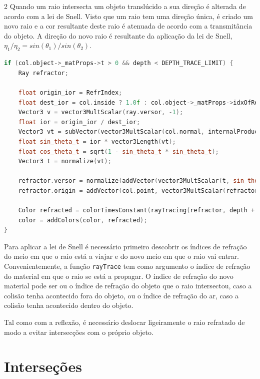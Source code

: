 \documentclass{article}
\begin{document}
\begin{multicols}{2}
    Quando um raio intersecta um objeto translúcido a sua direção é alterada
    de acordo com a lei de Snell. Visto que um raio tem uma direção única, é criado
    um novo raio e a cor resultante deste raio é atenuada de acordo com
    a transmitância do objeto. A direção do novo raio é resultante da aplicação
    da lei de Snell, $\eta_1/\eta_2 = sin(\theta_1)/sin(\theta_2)$.

\begin{lstlisting}[language=C++]
if (col.object->_matProps->t > 0 && depth < DEPTH_TRACE_LIMIT) {
    Ray refractor;

    float origin_ior = RefrIndex;
    float dest_ior = col.inside ? 1.0f : col.object->_matProps->idxOfRefraction;
    Vector3 v = vector3MultScalar(ray.versor, -1);
    float ior = origin_ior / dest_ior;
    Vector3 vt = subVector(vector3MultScalar(col.normal, internalProduct(v, col.normal)), v);
    float sin_theta_t = ior * vector3Length(vt);
    float cos_theta_t = sqrt(1 - sin_theta_t * sin_theta_t);
    Vector3 t = normalize(vt);

    refractor.versor = normalize(addVector(vector3MultScalar(t, sin_theta_t), vector3MultScalar(col.normal, -cos_theta_t)));
    refractor.origin = addVector(col.point, vector3MultScalar(refractor.versor, EPSILON));

    Color refracted = colorTimesConstant(rayTracing(refractor, depth + 1, dest_ior), col.object->_matProps->t);
    color = addColors(color, refracted);
}
\end{lstlisting}

    Para aplicar a lei de Snell é necessário primeiro descobrir os índices de
    refração do meio em que o raio está a viajar e do novo meio em que o raio
    vai entrar. Convenientemente, a função \verb|rayTrace| tem como argumento
    o índice de refração do material em que o raio se está a propagar. O
    índice de refração do novo material pode ser ou o índice de refração
    do objeto que o raio intersectou, caso a colisão tenha acontecido fora
    do objeto, ou o índice de refração do ar, caso a colisão tenha acontecido
    dentro do objeto.

    Tal como com a reflexão, é necessário deslocar ligeiramente o raio refratado
    de modo a evitar intersecções com o próprio objeto.

    \section{Interseções}


\end{multicols}
\end{document}
